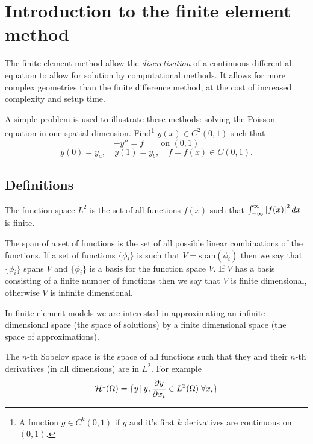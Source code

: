 \chapter{Introduction to the finite element method}
\label{sec:intr-finite-ele-diff}

The finite element method allow the \emph{discretisation} of a continuous differential equation to allow for solution by computational methods. 
It allows for more complex geometries than the finite difference method, at the cost of increased complexity and setup time.

A simple problem is used to illustrate these methods: solving the Poisson
equation in one spatial dimension. Find\footnote{A function $g\in C^{k}(0,1)$ if $g$ and it's first $k$ derivatives are continuous on $(0,1)$.} $y(x)\in C^{2}(0,1)$ such that
\begin{equation}
  -y''=f\qquad\text{on }(0,1)
  \label{eq:poisson1}
\end{equation}
\begin{equation*}
  y(0)=y_{a},\quad y(1)=y_{b},\quad f=f(x)\in C(0,1).
\end{equation*}


\section{Definitions}
\label{sec:fem-definitions}

The function space $L^{2}$ is the set of all functions $f(x)$ such
that $\intop_{-\infty}^{\infty}\abs{f(x)}^{2}dx$ is finite.

The span of a set of functions is the set of all possible linear combinations of
the functions. If a set of functions $\{\phi_{i}\}$ is such that
$V=\text{span}(\phi_{i})$ then we say that $\{\phi_{i}\}$ spans $V$ and
$\{\phi_{i}\}$ is a basis for the function space $V$. If $V$ has a basis consisting of a finite number of functions then we say that $V$ is finite dimensional, otherwise $V$ is infinite dimensional.

In finite element models we are interested in approximating an infinite
dimensional space (the space of solutions) by a finite dimensional
space (the space of approximations).

The $n$-th Sobelov space is the space of all functions such that they and their $n$-th derivatives (in all dimensions) are in $L^2$. For example
\begin{equation}
  \label{eq:H1}
  \mathcal{H}^1(\Omega) = \{ y \,|\, y, \frac{\partial y}{\partial x_i} \in L^2(\Omega) \; \forall x_i \}
\end{equation}

